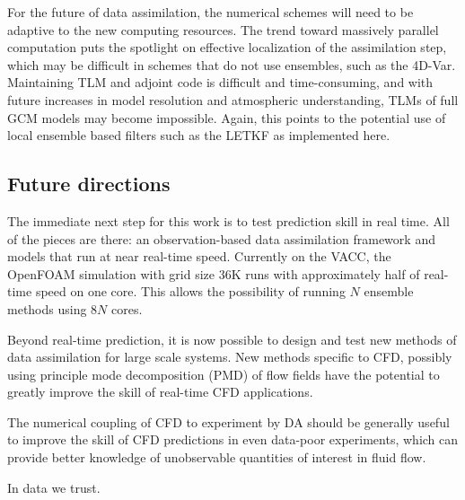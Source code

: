 For the future of data assimilation, the numerical schemes will need to be adaptive to the new computing resources.
The trend toward massively parallel computation puts the spotlight on effective localization of the assimilation step, which may be difficult in schemes that do not use ensembles, such as the 4D-Var.
Maintaining TLM and adjoint code is difficult and time-consuming, and with future increases in model resolution and atmospheric understanding, TLMs of full GCM models may become impossible.
Again, this points to the potential use of local ensemble based filters such as the LETKF as implemented here.

\subsection{Future directions}

The immediate next step for this work is to test prediction skill in real time.
All of the pieces are there: an observation-based data assimilation framework and models that run at near real-time speed.
Currently on the VACC, the OpenFOAM simulation with grid size 36K runs with approximately half of real-time speed on one core.
This allows the possibility of running $N$ ensemble methods using $8N$ cores.

Beyond real-time prediction, it is now possible to design and test new methods of data assimilation for large scale systems.
New methods specific to CFD, possibly using principle mode decomposition (PMD) of flow fields have the potential to greatly improve the skill of real-time CFD applications.

The numerical coupling of CFD to experiment by DA should be generally useful to improve the skill of CFD predictions in even data-poor experiments, which can provide better knowledge of unobservable quantities of interest in fluid flow.

\begin{center}
In data we trust. 
\end{center}
